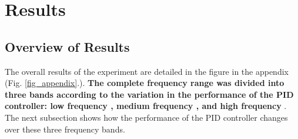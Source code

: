 \documentclass[conference]{IEEEtran}
\begin{document}
\section{Results}
\label{Results}

\subsection{Overview of Results}
\label{Overview of Results}
The overall results of the experiment are detailed in the figure in the appendix (Fig. \ref{fig_appendix}.). \textbf{The complete frequency range was divided into three bands according to the variation in the performance of the PID controller: low frequency , medium frequency , and high frequency }. The next subsection shows how the performance of the PID controller changes over these three frequency bands.
\end{document}
